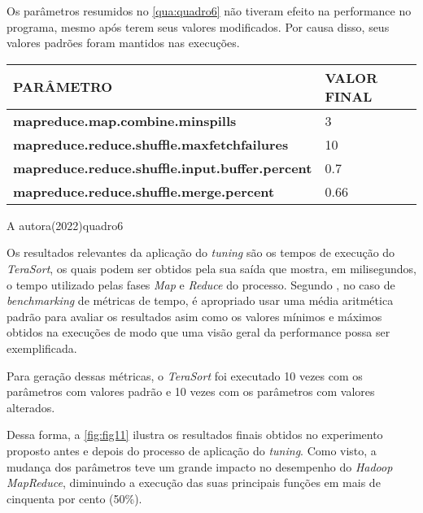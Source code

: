Os parâmetros resumidos no \autoref{qua:quadro6} não tiveram efeito na performance no programa, mesmo após terem seus valores modificados. Por causa disso, seus valores padrões foram mantidos nas execuções.

{\footnotesize
  \centering
  \begin{tabular}{|p{75mm}|p{25mm}|}\hline
    \textbf{PARÂMETRO}                                     & \textbf{VALOR FINAL} \\\hline
    \textbf{mapreduce.map.combine.minspills}               & 3                    \\\hline
    \textbf{mapreduce.reduce.shuffle.maxfetchfailures}     & 10                   \\\hline
    \textbf{mapreduce.reduce.shuffle.input.buffer.percent} & 0.7                  \\\hline
    \textbf{mapreduce.reduce.shuffle.merge.percent}        & 0.66                 \\\hline
  \end{tabular}}
{A autora(2022)}{quadro6}{}{}

Os resultados relevantes da aplicação do \textit{\gls{tuning}} são os tempos de execução do \textit{TeraSort}, os quais podem ser obtidos pela sua saída que mostra, em milisegundos, o tempo utilizado pelas fases \textit{Map} e \textit{Reduce} do processo. Segundo \textcite{Fleming86}, no caso de \textit{\gls{benchmark}ing} de métricas de tempo, é apropriado usar uma média aritmética padrão para avaliar os resultados asim como os valores mínimos e máximos obtidos na execuções de modo que uma visão geral da performance possa ser exemplificada.

Para geração dessas métricas, o \textit{TeraSort} foi executado 10 vezes com os parâmetros com valores padrão e 10 vezes com os parâmetros com valores alterados.

Dessa forma, a \autoref{fig:fig11} ilustra os resultados finais obtidos no experimento proposto antes e depois do processo de aplicação do \textit{\gls{tuning}}. Como visto, a mudança dos parâmetros teve um grande impacto no desempenho do \textit{Hadoop MapReduce}, diminuindo a execução das suas principais funções em mais de cinquenta por cento (50\%). 
